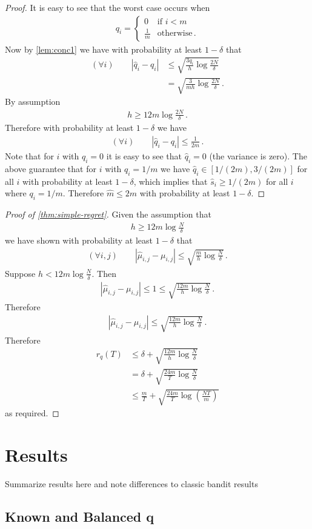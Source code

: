 \documentclass{article}
\newcommand{\eq}[1]{\begin{align*}#1\end{align*}}
\theoremstyle{plain}
\theoremstyle{definition}
\begin{document}
\begin{proof}
It is easy to see that the worst case occurs when 
\eq{
q_i = \begin{cases}
0 & \text{if } i < m \\
\frac{1}{m} & \text{otherwise}\,.
\end{cases}
}
Now by \cref{lem:conc1} we have with probability at least $1 - \delta$ that 
\eq{
(\forall i) \qquad \left| \hat q_i - q_i\right| 
&\leq \sqrt{\frac{3q_i}{h} \log \frac{2N}{\delta}} \\
&= \sqrt{\frac{3}{mh} \log\frac{2N}{\delta}}\,. 
}
By assumption 
\eq{
h \geq 12m \log \frac{2N}{\delta}\,.
}
Therefore with probability at least $1 - \delta$ we have
\eq{
(\forall i) \qquad \left|\hat q_i - q_i\right| \leq \frac{1}{2m}\,.
}
Note that for $i$ with $q_i = 0$ it is easy to see that $\hat q_i = 0$ (the variance is zero). The above guarantee that
for $i$ with $q_i = 1/m$ we have $\hat q_i \in [1/(2m), 3/(2m)]$ for all $i$ with probability at least $1 - \delta$,
which implies that $\hat s_i \geq 1/(2m)$ for all $i$ where $q_i = 1/m$.
Therefore $\hat m \leq 2m$ with probability at least $1 - \delta$. 
\end{proof}


\begin{proof}[Proof of \cref{thm:simple-regret}]
Given the assumption that
\eq{
h \geq 12m \log \frac{N}{\delta}
}
we have shown with probability at least $1 - \delta$ that
\eq{
(\forall i, j) \qquad \left|\hat \mu_{i,j} - \mu_{i,j}\right| \leq \sqrt{\frac{m}{h} \log\frac{N}{\delta}}\,.
}
Suppose $h < 12m \log \frac{N}{\delta}$. Then
\eq{
\left|\hat \mu_{i,j} - \mu_{i,j}\right| \leq 1 \leq \sqrt{\frac{12m}{h} \log \frac{N}{\delta}}\,.
}
Therefore
\eq{
\left|\hat \mu_{i,j} - \mu_{i,j}\right| \leq \sqrt{\frac{12m}{h} \log \frac{N}{\delta}}\,.
}
Therefore 
\eq{
r_q(T) 
&\leq \delta + \sqrt{\frac{12m}{h} \log \frac{N}{\delta}} \\
&= \delta + \sqrt{\frac{24m}{T} \log \frac{N}{\delta}} \\
&\leq \frac{m}{T} + \sqrt{\frac{24m}{T} \log \left(\frac{NT}{m}\right)}
}
as required.
\end{proof}

\section*{Results}

Summarize results here and note differences to classic bandit results

\subsection*{Known and Balanced q}
\end{document}
